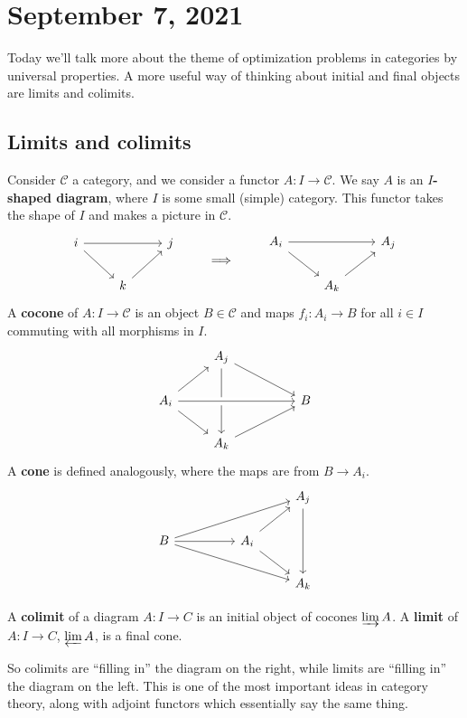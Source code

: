 \section{September 7, 2021} 
Today we'll talk more about the theme of optimization problems in categories by universal properties. A more useful way of thinking about initial and final objects are limits and colimits.

\subsection{Limits and colimits}
Consider $\mathcal{C} $ a category, and we consider a functor $A \colon I \to \mathcal{C} $. We say $A$ is an $I$\textbf{-shaped diagram}, where $I$ is some small (simple) category. This functor takes the shape of $I$ and makes a picture  in $\mathcal{C} $. \[
\begin{tikzcd}
i \arrow[rr] \arrow[rd] &              & j \\
                        & k \arrow[ru] &  
\end{tikzcd} \qquad \implies  
\qquad 
\begin{tikzcd}
A_i \arrow[rr] \arrow[rd] &                & A_j \\
                          & A_k \arrow[ru] &    
\end{tikzcd}
\] A \textbf{cocone} of $A \colon I \to \mathcal{C} $ is an object $B \in \mathcal{C} $ and maps $f _i  \colon A_i  \to B$ for all $i \in I$ commuting with all morphisms in $I$. \[
\begin{tikzcd}
                                      & A_j \arrow[dd] \arrow[rrd] &  &   \\
A_i \arrow[ru] \arrow[rd] \arrow[rrr, crossing over] &                            &  & B \\
                                      & A_k \arrow[rru]            &  &  
\end{tikzcd}
\] A \textbf{cone} is defined analogously, where the maps are from $B \to A_i $. \[
\begin{tikzcd}
                                       &  &                           & A_j \arrow[dd] \\
B \arrow[rrru] \arrow[rr] \arrow[rrrd] &  & A_i \arrow[ru] \arrow[rd] &                \\
                                       &  &                           & A_k           
\end{tikzcd}
\] 
\begin{definition}[]
    A \textbf{colimit} of a diagram $A \colon I \to C$ is an initial object of cocones $\varinjlim A$. A  \textbf{limit} of $A \colon I \to C$, $\varprojlim A$, is a final cone.
\end{definition}
So colimits are ``filling in'' the diagram on the right, while limits are ``filling in'' the diagram on the left. This is one of the most important ideas in category theory, along with adjoint functors which essentially say the same thing.

